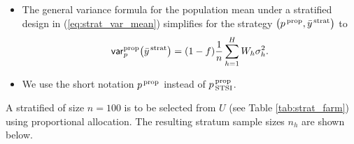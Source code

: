 \documentclass{my_eth_beamer}
\numberwithin{equation}{section}
\begin{document}
\begin{frame}
    \begin{itemize}
    \setlength{\itemsep}{8pt}
    \item The general \alert{variance formula} for the population mean under a
        stratified design in (\ref{eq:strat_var_mean}) simplifies for the
        \alert{strategy} $\big(p^{\,\mathrm{prop}}, \bar{y}^{\,\mathrm{strat}}\big)$ to
            \vspace{0.25em}
            \begin{equation*}
                \mathsf{var}_p^{\mathrm{prop}}\big(\bar{y}^{\,\mathrm{strat}}\big) = (1 - f)\frac{1}{n}
                    \sum_{h = 1}^H W_h \sigma_{h}^2.
            \end{equation*}
        \item We use the short notation $p^{\,\mathrm{prop}}$ instead of
            $p_{\,\mathrm{STSI}}^{\,\mathrm{prop}}$.
    \end{itemize}
    \vspace{1em}
    \begin{Bsp}
        \label{ex:strat_county_prop}
        A stratified \SRS of size $n=100$ is to be selected from $U$ (see
        Table \ref{tab:strat_farm}) using proportional allocation. The
        resulting stratum sample sizes $n_h$ are shown below.
    \end{Bsp}
\end{frame}
\end{document}
